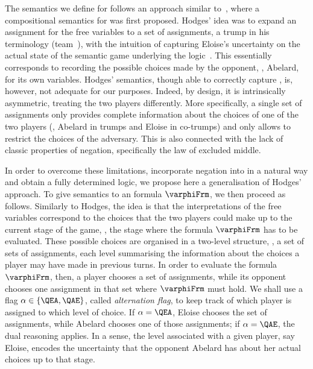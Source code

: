 \documentclass[authoryear]{elsarticle}
\begin{document}
The semantics we define for \ADIF follows an approach similar to~\citep{Hod97a},
where a compositional semantics for \IF was first proposed.
Hodges' idea was to expand an assignment for the free variables to a set of
assignments, a trump in his terminology (\aka team~\citep{Vaa07}), with the
intuition of capturing Eloise's uncertainty on the actual state of the semantic
game underlying the logic~\citep{HS89}.
This essentially corresponds to recording the possible choices made by the
opponent, \ie, Abelard, for its own variables.
Hodges' semantics, though able to correctly capture \IF, is, however, not
adequate for our purposes.
Indeed, by design, it is intrinsically asymmetric, treating the two players
differently.
More specifically, a single set of assignments only provides complete
information about the choices of one of the two players (\ie, Abelard in trumps
and Eloise in co-trumps) and only allows to restrict the choices of the adversary.
This is also connected with the lack of classic properties of negation,
specifically the law of excluded middle.

In order to overcome these limitations, incorporate negation into \ADIF in a
natural way and obtain a fully determined logic, we propose here a
generalisation of Hodges' approach.
To give semantics to an \ADIF formula $\varphiFrm$, we then proceed as follows.
Similarly to Hodges, the idea is that the interpretations of the free variables
correspond to the choices that the two players could make up to the current
stage of the game, \ie, the stage where the formula $\varphiFrm$ has to be
evaluated.
These possible choices are organised in a two-level structure, \ie, a set of
sets of assignments, each level summarising the information about the choices a
player may have made in previous turns.
In order to evaluate the formula $\varphiFrm$, then, a player chooses a set of
assignments, while its opponent chooses one assignment in that set where
$\varphiFrm$ must hold.
We shall use a flag $\alpha \in \{ \QEA, \QAE \}$, called \emph{alternation
flag}, to keep track of which player is assigned to which level of choice.
If $\alpha = \QEA$, Eloise chooses the set of assignments, while Abelard chooses
one of those assignments; if $\alpha = \QAE$, the dual reasoning applies.
In a sense, the level associated with a given player, say Eloise, encodes the
uncertainty that the opponent Abelard has about her actual choices up to that
stage.
\end{document}

